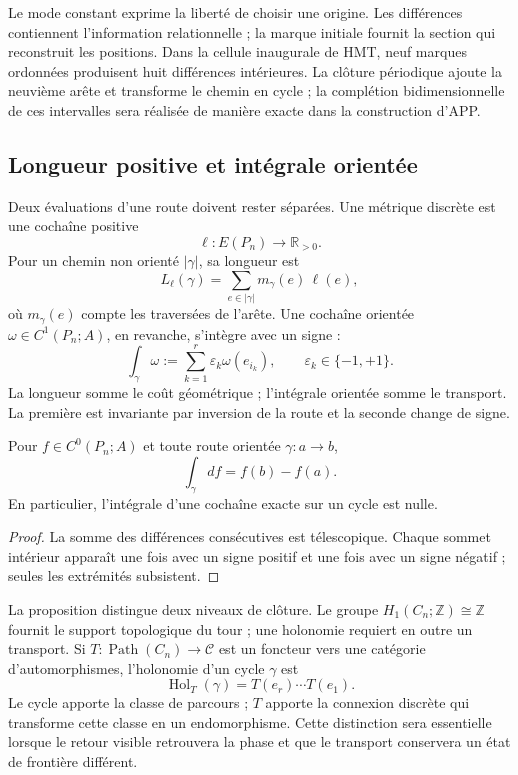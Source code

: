 Le mode constant exprime la liberté de choisir une origine. Les différences
contiennent l'information relationnelle ; la marque initiale fournit la section
qui reconstruit les positions. Dans la cellule inaugurale de HMT, neuf marques
ordonnées produisent huit différences intérieures. La clôture périodique ajoute la
neuvième arête et transforme le chemin en cycle ; la complétion bidimensionnelle
de ces intervalles sera réalisée de manière exacte dans la construction d'APP.

\subsection{Longueur positive et intégrale orientée}

Deux évaluations d'une route doivent rester séparées. Une métrique discrète
est une cochaîne positive
\[
 \ell:E(P_n)\longrightarrow\mathbb R_{>0}.
\]
Pour un chemin non orienté \(|\gamma|\), sa longueur est
\begin{equation}
 L_\ell(\gamma)=\sum_{e\in|\gamma|}m_\gamma(e)\,\ell(e),
 \label{eq:longitud-positiva-camino-rev2}
\end{equation}
où \(m_\gamma(e)\) compte les traversées de l'arête. Une cochaîne
orientée \(\omega\in C^1(P_n;A)\), en revanche, s'intègre avec un signe :
\begin{equation}
 \int_\gamma\omega
 :=\sum_{k=1}^{r}\varepsilon_k\omega(e_{i_k}),
 \qquad \varepsilon_k\in\{-1,+1\}.
 \label{eq:integral-cocadena-camino-rev2}
\end{equation}
La longueur somme le coût géométrique ; l'intégrale orientée somme le transport. La
première est invariante par inversion de la route et la seconde change de signe.

\begin{proposition}
\label{prop:teorema-fundamental-discreto-rev2}
Pour \(f\in C^0(P_n;A)\) et toute route orientée \(\gamma:a\to b\),
\[
 \int_\gamma df=f(b)-f(a).
\]
En particulier, l'intégrale d'une cochaîne exacte sur un cycle est nulle.
\end{proposition}

\begin{proof}
La somme des différences consécutives est télescopique. Chaque sommet intérieur
apparaît une fois avec un signe positif et une fois avec un signe négatif ; seules
les extrémités subsistent.
\end{proof}

La proposition distingue deux niveaux de clôture. Le groupe
\(H_1(C_n;\mathbb Z)\cong\mathbb Z\) fournit le support topologique du
tour ; une holonomie requiert en outre un transport. Si
\(T:\operatorname{Path}(C_n)\to\mathcal C\) est un foncteur vers une catégorie
d'automorphismes, l'holonomie d'un cycle \(\gamma\) est
\begin{equation}
 \operatorname{Hol}_T(\gamma)=T(e_r)\cdots T(e_1).
 \label{eq:holonomia-transporte-ciclo-rev2}
\end{equation}
Le cycle apporte la classe de parcours ; \(T\) apporte la connexion discrète qui
transforme cette classe en un endomorphisme. Cette distinction sera essentielle lorsque
le retour visible retrouvera la phase et que le transport conservera un état de
frontière différent.

